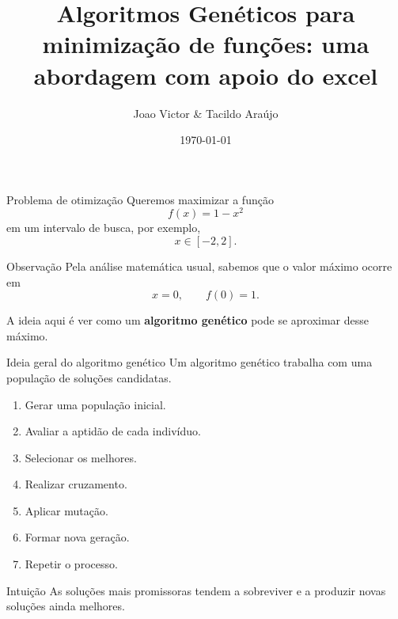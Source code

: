 \documentclass[mathserif, 10pt]{beamer}
\title[IFAM/CMC]{\textbf{Algoritmos Genéticos para minimização de funções: uma abordagem com apoio do excel}}
\author[Prof. Dr. Tacildo de S. Araújo]{Joao Victor \& Tacildo Araújo}
\date{\today}
\institute[]{Instituto Federal de Educação, Ciência e Tecnologia do Amazonas \\ Campus Manaus Centro }
\date[\textcolor{white}{\today} ]
{}
\begin{document}
\justifying
\frame{\titlepage}


\begin{frame}{Problema de otimização}
	Queremos maximizar a função
	\[
	f(x)=1-x^2
	\]
	em um intervalo de busca, por exemplo,
	\[
	x\in[-2,2].
	\]
	
	\pause
	
	\begin{block}{Observação}
		Pela análise matemática usual, sabemos que o valor máximo ocorre em
		\[
		x=0,
		\qquad
		f(0)=1.
		\]
	\end{block}
	
	\pause
	
	A ideia aqui é ver como um \textbf{algoritmo genético} pode se aproximar desse máximo.
\end{frame}

\begin{frame}{Ideia geral do algoritmo genético}
	Um algoritmo genético trabalha com uma \alert{população} de soluções candidatas.
	
	\pause
	
	\begin{enumerate}
		\item Gerar uma população inicial.
		\item Avaliar a aptidão de cada indivíduo.
		\item Selecionar os melhores.
		\item Realizar cruzamento.
		\item Aplicar mutação.
		\item Formar nova geração.
		\item Repetir o processo.
	\end{enumerate}
	
	\pause
	
	\begin{block}{Intuição}
		As soluções mais promissoras tendem a sobreviver e a produzir novas soluções ainda melhores.
	\end{block}
\end{frame}
\end{document}
